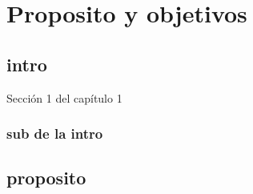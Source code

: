 \chapter{Proposito y objetivos} %
\label{cha:energia_solar}


\section{intro}
Sección 1 del capítulo 1

\subsection{sub de la intro} %
\label{sub:introduccion}

\section{proposito}

